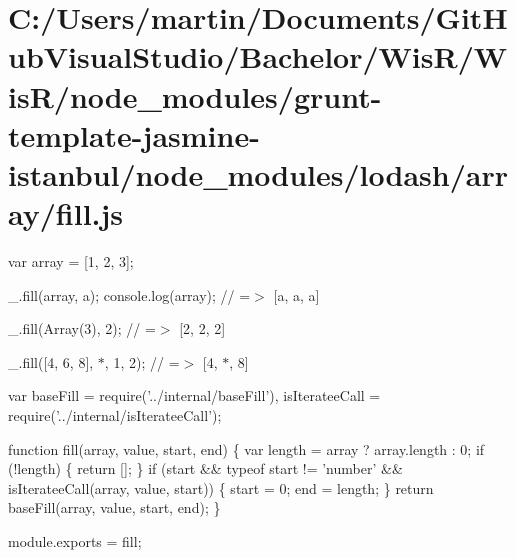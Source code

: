 \hypertarget{_c_1_2_users_2martin_2_documents_2_git_hub_visual_studio_2_bachelor_2_wis_r_2_wis_r_2node_modulebe17ae2452bbbc9045a9af16bb976b6e}{}\section{C\+:/\+Users/martin/\+Documents/\+Git\+Hub\+Visual\+Studio/\+Bachelor/\+Wis\+R/\+Wis\+R/node\+\_\+modules/grunt-\/template-\/jasmine-\/istanbul/node\+\_\+modules/lodash/array/fill.\+js}
var array = \mbox{[}1, 2, 3\mbox{]};

\+\_\+.\+fill(array, \textquotesingle{}a\textquotesingle{}); console.\+log(array); // =$>$ \mbox{[}\textquotesingle{}a\textquotesingle{}, \textquotesingle{}a\textquotesingle{}, \textquotesingle{}a\textquotesingle{}\mbox{]}

\+\_\+.\+fill(\+Array(3), 2); // =$>$ \mbox{[}2, 2, 2\mbox{]}

\+\_\+.\+fill(\mbox{[}4, 6, 8\mbox{]}, \textquotesingle{}$\ast$\textquotesingle{}, 1, 2); // =$>$ \mbox{[}4, \textquotesingle{}$\ast$\textquotesingle{}, 8\mbox{]}


\begin{DoxyCodeInclude}
var baseFill = require(\textcolor{stringliteral}{'../internal/baseFill'}),
    isIterateeCall = require(\textcolor{stringliteral}{'../internal/isIterateeCall'});

\textcolor{keyword}{function} fill(array, value, start, end) \{
  var length = array ? array.length : 0;
  \textcolor{keywordflow}{if} (!length) \{
    \textcolor{keywordflow}{return} [];
  \}
  \textcolor{keywordflow}{if} (start && typeof start != \textcolor{stringliteral}{'number'} && isIterateeCall(array, value, start)) \{
    start = 0;
    end = length;
  \}
  \textcolor{keywordflow}{return} baseFill(array, value, start, end);
\}

module.exports = fill;
\end{DoxyCodeInclude}
 